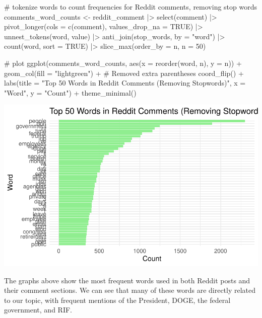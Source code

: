 \documentclass[
  letterpaper,
  DIV=11,
  numbers=noendperiod]{scrartcl}
\newenvironment{Shaded}{\begin{snugshade}}{\end{snugshade}}
\newcommand{\AttributeTok}[1]{\textcolor[rgb]{0.40,0.45,0.13}{#1}}
\newcommand{\CommentTok}[1]{\textcolor[rgb]{0.37,0.37,0.37}{#1}}
\newcommand{\ConstantTok}[1]{\textcolor[rgb]{0.56,0.35,0.01}{#1}}
\newcommand{\DecValTok}[1]{\textcolor[rgb]{0.68,0.00,0.00}{#1}}
\newcommand{\FunctionTok}[1]{\textcolor[rgb]{0.28,0.35,0.67}{#1}}
\newcommand{\NormalTok}[1]{\textcolor[rgb]{0.00,0.23,0.31}{#1}}
\newcommand{\OtherTok}[1]{\textcolor[rgb]{0.00,0.23,0.31}{#1}}
\newcommand{\SpecialCharTok}[1]{\textcolor[rgb]{0.37,0.37,0.37}{#1}}
\newcommand{\StringTok}[1]{\textcolor[rgb]{0.13,0.47,0.30}{#1}}
\begin{document}
\begin{Shaded}
\begin{Highlighting}[]
\CommentTok{\# tokenize words to count frequencies for Reddit comments, removing stop words}
\NormalTok{comments\_word\_counts }\OtherTok{\textless{}{-}}\NormalTok{ reddit\_comment }\SpecialCharTok{|\textgreater{}}
  \FunctionTok{select}\NormalTok{(comment) }\SpecialCharTok{|\textgreater{}}
  \FunctionTok{pivot\_longer}\NormalTok{(}\AttributeTok{cols =} \FunctionTok{c}\NormalTok{(comment), }\AttributeTok{values\_drop\_na =} \ConstantTok{TRUE}\NormalTok{) }\SpecialCharTok{|\textgreater{}}
  \FunctionTok{unnest\_tokens}\NormalTok{(word, value) }\SpecialCharTok{|\textgreater{}}
  \FunctionTok{anti\_join}\NormalTok{(stop\_words, }\AttributeTok{by =} \StringTok{"word"}\NormalTok{) }\SpecialCharTok{|\textgreater{}}
  \FunctionTok{count}\NormalTok{(word, }\AttributeTok{sort =} \ConstantTok{TRUE}\NormalTok{) }\SpecialCharTok{|\textgreater{}}
  \FunctionTok{slice\_max}\NormalTok{(}\AttributeTok{order\_by =}\NormalTok{ n, }\AttributeTok{n =} \DecValTok{50}\NormalTok{)}

\CommentTok{\# plot}
\FunctionTok{ggplot}\NormalTok{(comments\_word\_counts, }\FunctionTok{aes}\NormalTok{(}\AttributeTok{x =} \FunctionTok{reorder}\NormalTok{(word, n), }\AttributeTok{y =}\NormalTok{ n)) }\SpecialCharTok{+}
  \FunctionTok{geom\_col}\NormalTok{(}\AttributeTok{fill =} \StringTok{"lightgreen"}\NormalTok{) }\SpecialCharTok{+}  \CommentTok{\# Removed extra parentheses}
  \FunctionTok{coord\_flip}\NormalTok{() }\SpecialCharTok{+}
  \FunctionTok{labs}\NormalTok{(}\AttributeTok{title =} \StringTok{"Top 50 Words in Reddit Comments (Removing Stopwords)"}\NormalTok{,}
       \AttributeTok{x =} \StringTok{"Word"}\NormalTok{,}
       \AttributeTok{y =} \StringTok{"Count"}\NormalTok{) }\SpecialCharTok{+}
  \FunctionTok{theme\_minimal}\NormalTok{()}
\end{Highlighting}
\end{Shaded}

\includegraphics{Reddit_eda_files/figure-pdf/unnamed-chunk-8-2.pdf}

The graphs above show the most frequent words used in both Reddit posts
and their comment sections. We can see that many of these words are
directly related to our topic, with frequent mentions of the President,
DOGE, the federal government, and RIF.
\end{document}
